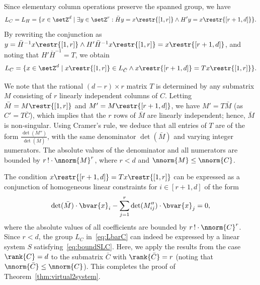 Since elementary column operations preserve the spanned group, we have
\[
    L_{C} = L_{H} = \{x \in \setZ^d \mid \exists y \in
    \setZ^r : \bar{H}y = x\restr{[1,r]} \land H'y = x\restr{[r+1,d]}\}.
\]
By rewriting the conjunction as $y = \bar{H}^{-1}x\restr{[1,r]}\land
H'\bar{H}^{-1}x\restr{[1,r]} = x\restr{[r+1,d]}$, and noting that
$H'\bar{H}^{-1} = T$, we obtain
\begin{equation}\label{eq:LbarC}
	L_{C}=\{x\in\setZ^d\mid x\restr{[1,r]}\in L_{\bar{C}}\land
x\restr{[r+1,d]}=T x\restr{[1,r]}\}.
\end{equation}

\noindent
We note that the rational $(d{-}r)\times r$ matrix $T$ is determined
by any submatrix $M$ consisting of 
$r$ linearly independent columns of $C$.
Letting
$\bar{M}=M\restr{[1,r]}$
and $M'=M\restr{[r+1,d]}$, we have $M'=T\bar{M}$ (as $C'=T\bar{C}$), which
implies that the $r$ rows of $\bar{M}$ are linearly independent;
hence, $\bar{M}$
is non-singular.
 Using Cramer's rule,
we deduce that all entries of $T$ are of the form
$\frac{\det(M'')}{\det(\bar{M})}$, with the same denominator
$\det(\bar{M})$ and
varying integer numerators. The absolute values of the denominator and all numerators are
bounded by $r\,!\cdot \nnorm{M}^r$, where $r<d$ and $\nnorm{M}\leq \nnorm{C}$.

The condition $x\restr{[r+1,d]}=T x\restr{[1,r]}$ can be expressed
as a conjunction of homogeneous linear constraints for $i\in[r{+}1,d]$ of the form 
\[
	\det(\bar{M}) \cdot \bvar{x}_i - \sum_{j=1}^r \det(M''_{ij}) \cdot
    \bvar{x}_j = 0,
\]
where the absolute values of all coefficients are bounded by
$r\,! \cdot \nnorm{C}^r$. 
Since $r < d$, the group $L_{C}$ in~\eqref{eq:LbarC} can indeed
be expressed by a linear system $S$ satisfying~\eqref{eq:boundSLC}.
Here, we apply the results from the case $\rank{C} = d$ to the
submatrix $\bar{C}$ with $\rank{\bar{C}} = r$ (noting that
$\nnorm{\bar{C}} \leq \nnorm{C}$). This completes the proof of Theorem~\ref{thm:virtual2system}.
